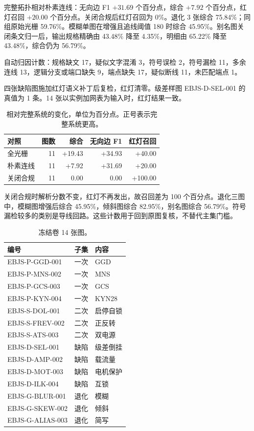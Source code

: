 完整拓扑相对朴素连线：无向边 F1 $+31.69$ 个百分点，综合 $+7.92$ 个百分点，红灯召回 $+20.00$ 个百分点。关闭合规后红灯召回为 0\%。退化 3 张综合 75.84\%；同组原始光栅 59.76\%。模糊单图在增强且追线阈值 180 时综合 45.95\%。别名图关闭条文归一后，输出规格精确由 43.48\% 降至 4.35\%，明细由 65.22\% 降至 43.48\%，综合仍为 56.79\%。

自动归因计数：规格缺文 17，疑似文字混淆 3，符号误检 2，符号漏检 11，多余连线 13，逻辑分支或端口缺失 9，端点缺失 17，疑似断线 11，未匹配端点 1。

四张缺陷图施加红灯语义补丁后复检，红灯清零。级差样图 EBJS-D-SEL-001 的真值为 1 条。14 张以实例加网表为输入时，红灯结果一致。

\begin{table}[ht]
\centering
\caption{相对完整系统的变化，单位为百分点。正号表示完整系统更高。}
\footnotesize
\begin{tabular}{lrrrr}
\toprule
对照 & 图数 & 综合 & 无向边 F1 & 红灯召回 \\
\midrule
全光栅 & 11 & +19.43 & +34.93 & +40.00 \\
朴素连线 & 11 & +7.92 & +31.69 & +20.00 \\
关闭合规 & 11 & 0.00 & 0.00 & +100.00 \\
\bottomrule
\end{tabular}
\end{table}

关闭合规时解析分数不变，红灯不再发出，故召回差为 100 个百分点。退化三图中，模糊图增强后综合 45.95\%，倾斜图综合 82.95\%，别名图综合 56.79\%。符号漏检较多的类别是导线回路。这些计数用于回到原图复核，不替代主集门槛。

\begin{table}[ht]
\centering
\caption{冻结卷 14 张图。}
\footnotesize
\begin{tabular}{lll}
\toprule
编号 & 子集 & 内容 \\
\midrule
EBJS-P-GGD-001 & 一次 & GGD \\
EBJS-P-MNS-002 & 一次 & MNS \\
EBJS-P-GCS-003 & 一次 & GCS \\
EBJS-P-KYN-004 & 一次 & KYN28 \\
EBJS-S-DOL-001 & 二次 & 启停自锁 \\
EBJS-S-FREV-002 & 二次 & 正反转 \\
EBJS-S-ATS-003 & 二次 & 双电源 \\
EBJS-D-SEL-001 & 缺陷 & 级差倒挂 \\
EBJS-D-AMP-002 & 缺陷 & 载流量 \\
EBJS-D-MOT-003 & 缺陷 & 电机保护 \\
EBJS-D-ILK-004 & 缺陷 & 互锁 \\
EBJS-G-BLUR-001 & 退化 & 模糊 \\
EBJS-G-SKEW-002 & 退化 & 倾斜 \\
EBJS-G-ALIAS-003 & 退化 & 简写 \\
\bottomrule
\end{tabular}
\end{table}

